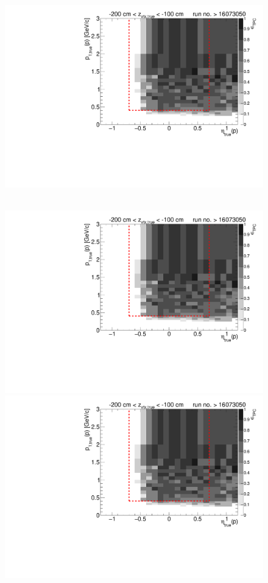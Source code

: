\begin{figure}[hb]
{		\includegraphics[width=\linewidth,page=17]{graphics/eff/Eff2D_TPC_proton_Minus_RunRange2.pdf}
	}~
	\parbox{0.495\textwidth}{
		\centering
		\includegraphics[width=\linewidth,page=12]{graphics/eff/Eff2D_TPC_proton_Minus_RunRange2.pdf}\\
		\includegraphics[width=\linewidth,page=14]{graphics/eff/Eff2D_TPC_proton_Minus_RunRange2.pdf}\\
}
\end{figure}
